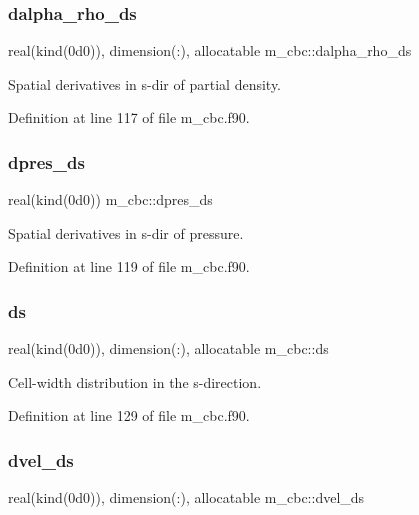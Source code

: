 \subsubsection{\texorpdfstring{dalpha\+\_\+rho\+\_\+ds}{dalpha\_rho\_ds}}
{\footnotesize\ttfamily real(kind(0d0)), dimension(\+:), allocatable m\+\_\+cbc\+::dalpha\+\_\+rho\+\_\+ds}



Spatial derivatives in s-\/dir of partial density. 



Definition at line 117 of file m\+\_\+cbc.\+f90.

\mbox{\label{namespacem__cbc_ae49b66468d949880db575e26231b641c}} 
\subsubsection{\texorpdfstring{dpres\+\_\+ds}{dpres\_ds}}
{\footnotesize\ttfamily real(kind(0d0)) m\+\_\+cbc\+::dpres\+\_\+ds}



Spatial derivatives in s-\/dir of pressure. 



Definition at line 119 of file m\+\_\+cbc.\+f90.

\mbox{\label{namespacem__cbc_ae49e36ba93b9f5cb3adf9551c1cfb276}} 
\subsubsection{\texorpdfstring{ds}{ds}}
{\footnotesize\ttfamily real(kind(0d0)), dimension(\+:), allocatable m\+\_\+cbc\+::ds}



Cell-\/width distribution in the s-\/direction. 



Definition at line 129 of file m\+\_\+cbc.\+f90.

\mbox{\label{namespacem__cbc_ac2bd4c0c73cfb0582f003473d0ec4f7f}} 
\subsubsection{\texorpdfstring{dvel\+\_\+ds}{dvel\_ds}}
{\footnotesize\ttfamily real(kind(0d0)), dimension(\+:), allocatable m\+\_\+cbc\+::dvel\+\_\+ds}



